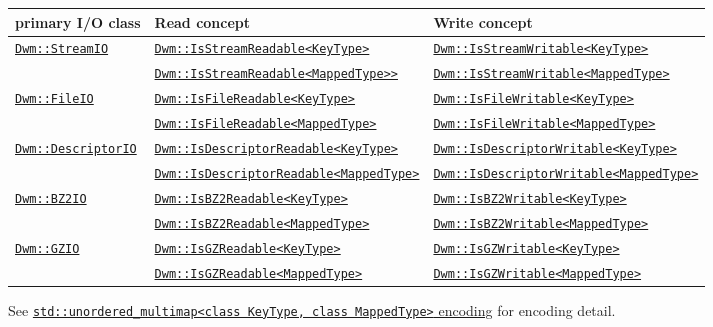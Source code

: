 \begin{minipage}{\textwidth}
\begin{tabular}{lll}
\textbf{primary I/O class} & \textbf{Read concept} & \textbf{Write concept} \\ \hline
\multirow{2}{*}{\hyperref[section:DwmStreamIOClass]{\texttt{Dwm::StreamIO}}} & \hyperref[concept:DwmIsStreamReadable]{\texttt{Dwm::IsStreamReadable<KeyType>}} & \hyperref[concept:DwmIsStreamWritable]{\texttt{Dwm::IsStreamWritable<KeyType>}} \\
 & \hyperref[concept:DwmIsStreamReadable]{\texttt{Dwm::IsStreamReadable<MappedType>>}} & \hyperref[concept:DwmIsStreamWritable]{\texttt{Dwm::IsStreamWritable<MappedType>}} \\ \hline
\multirow{2}{*}{\hyperref[section:DwmFileIOClass]{\texttt{Dwm::FileIO}}} & \hyperref[concept:DwmIsFileReadable]{\texttt{Dwm::IsFileReadable<KeyType>}} & \hyperref[concept:DwmIsFileWritable]{\texttt{Dwm::IsFileWritable<KeyType>}} \\
 & \hyperref[concept:DwmIsFileReadable]{\texttt{Dwm::IsFileReadable<MappedType>}} & \hyperref[concept:DwmIsFileWritable]{\texttt{Dwm::IsFileWritable<MappedType>}} \\ \hline
\multirow{2}{*}{\hyperref[section:DwmDescriptorIOClass]{\texttt{Dwm::DescriptorIO}}} & \hyperref[concept:DwmIsDescriptorReadable]{\texttt{Dwm::IsDescriptorReadable<KeyType>}} & \hyperref[concept:DwmIsDescriptorWritable]{\texttt{Dwm::IsDescriptorWritable<KeyType>}} \\
 & \hyperref[concept:DwmIsDescriptorReadable]{\texttt{Dwm::IsDescriptorReadable<MappedType>}} & \hyperref[concept:DwmIsDescriptorWritable]{\texttt{Dwm::IsDescriptorWritable<MappedType>}} \\ \hline
\multirow{2}{*}{\hyperref[section:DwmBZ2IOClass]{\texttt{Dwm::BZ2IO}}} & \hyperref[concept:DwmIsBZ2Readable]{\texttt{Dwm::IsBZ2Readable<KeyType>}} & \hyperref[concept:DwmIsBZ2Writable]{\texttt{Dwm::IsBZ2Writable<KeyType>}} \\
 & \hyperref[concept:DwmIsBZ2Readable]{\texttt{Dwm::IsBZ2Readable<MappedType>}} & \hyperref[concept:DwmIsBZ2Writable]{\texttt{Dwm::IsBZ2Writable<MappedType>}} \\ \hline
\multirow{2}{*}{\hyperref[section:DwmGZIOClass]{\texttt{Dwm::GZIO}}} & \hyperref[concept:DwmIsGZReadable]{\texttt{Dwm::IsGZReadable<KeyType>}} & \hyperref[concept:DwmIsGZWritable]{\texttt{Dwm::IsGZWritable<KeyType>}} \\
 & \hyperref[concept:DwmIsGZReadable]{\texttt{Dwm::IsGZReadable<MappedType>}} & \hyperref[concept:DwmIsGZWritable]{\texttt{Dwm::IsGZWritable<MappedType>}} \\
\end{tabular}
\vspace{1ex}

See \hyperref[encoding:stdUnorderedMultimap]{\texttt{std::unordered\_multimap<class KeyType, class MappedType>} encoding} for encoding detail.
\end{minipage}

